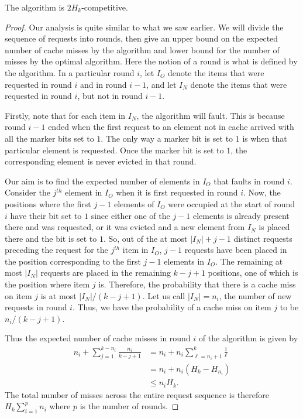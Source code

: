 \begin{theorem}
	The \marker algorithm is $2H_k$-competitive.
	\label{thm:rand-paging-ub}
\end{theorem}
\begin{proof}
	Our analysis is quite similar to what we saw earlier. We will divide the sequence of requests into rounds, then give an upper bound on the expected number of cache misses by the \marker algorithm and lower bound for the number of misses by the optimal algorithm. Here the notion of a round is what is defined by the \marker algorithm. In a particular round $i$, let $I_O$ denote the items that were requested in round $i$ and in round $i-1$, and let $I_N$ denote the items that were requested in round $i$, but not in round $i-1$. 
	
	Firstly, note that for each item in $I_N$, the \marker algorithm will fault. This is because round $i-1$ ended when the first request to an element not in cache arrived with all the marker bits set to $1$. The only way a marker bit is set to $1$ is when that particular element is requested. Once the marker bit is set to $1$, the corresponding element is never evicted in that round. 
	
	Our aim is to find the expected number of elements in $I_O$ that faults in round $i$. Consider the $j^{th}$ element in $I_O$ when it is first requested in round $i$. Now, the positions where the first $j-1$ elements of $I_O$ were occupied at the start of round $i$ have their bit set to $1$ since either one of the $j-1$ elements is already present there and was requested, or it was evicted and a new element from $I_N$ is placed there and the bit is set to $1$. So, out of the at most $|I_N| + j - 1$ distinct requests preceding the request for the $j^{th}$ item in $I_O$, $j-1$ requests have been placed in the position corresponding to the first $j-1$ elements in $I_O$. The remaining at most $|I_N|$ requests are placed in the remaining $k - j + 1$ positions, one of which is the position where item $j$ is. Therefore, the probability that there is a cache miss on item $j$ is at most $|I_N|/(k - j + 1)$. Let us call $|I_N| = n_i$, the number of new requests in round $i$. Thus, we have the probability of a cache miss on item $j$ to be $n_i/(k-j+1)$.
	
	Thus the expected number of cache misses in round $i$ of the algorithm is given by
	\begin{align*}
		n_i + \sum_{j=1}^{k-n_i} \frac{n_i}{k-j+1} &= n_i + n_i\sum_{\ell = n_i + 1}^k \frac{1}{\ell}\\
		&= n_i + n_i(H_k - H_{n_i})\\
		&\leq n_i H_k.
	\end{align*}
	The total number of misses across the entire request sequence is therefore $H_k \sum_{i=1}^p n_i$ where $p$ is the number of rounds.
	

\end{proof}
